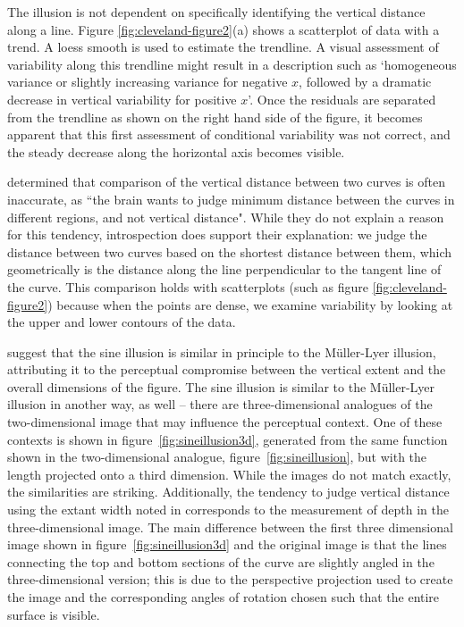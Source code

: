 \documentclass[11pt]{isuthesis}\usepackage[]{graphicx}\usepackage[]{color}
\begin{document}
The illusion is not dependent on specifically identifying the vertical distance along a line. Figure \ref{fig:cleveland-figure2}(a) shows a scatterplot of data with a trend. A loess smooth is used to estimate the trendline. A visual assessment of variability along this trendline might result in a description such as `homogeneous variance or slightly increasing variance for  negative $x$, followed by a dramatic decrease in vertical variability for positive $x$'. Once the residuals are separated from the trendline as shown on the right hand side of the figure, it becomes apparent that this first assessment of conditional variability was not correct, and the steady decrease along the horizontal axis becomes visible.

\citet{cleveland:1984} determined that comparison of the vertical distance between two curves is often inaccurate, as ``the brain wants to judge minimum distance between the curves in different regions, and not vertical distance". While they do not explain a reason for this tendency, introspection does support their explanation: we judge the distance between two curves based on the shortest distance between them, which geometrically is the distance along the line perpendicular to the tangent line of the curve. This comparison holds with scatterplots (such as figure \ref{fig:cleveland-figure2}) because when the points are dense, we examine variability by looking at the upper and lower contours of the data.

\citet{day:1991} suggest that the sine illusion is similar in principle to the M\"uller-Lyer illusion, attributing it to the perceptual compromise between the vertical extent and the overall dimensions of the figure. The sine illusion is similar to the  M\"uller-Lyer illusion in another way, as well -- there are three-dimensional analogues of the two-dimensional image that may influence the perceptual context. One of these contexts is shown in figure~\ref{fig:sineillusion3d}, generated from the same function shown in the two-dimensional analogue, figure~\ref{fig:sineillusion}, but with the length projected onto a third dimension. While the images do not match exactly, the similarities are striking. Additionally, the tendency to judge vertical distance using the extant width noted in \citep{cleveland:1985} corresponds to the measurement of depth in the three-dimensional image. The main difference between the first three dimensional image shown in figure~\ref{fig:sineillusion3d} and the original image is that the lines connecting the top and bottom sections of the curve are slightly angled in the three-dimensional version; this is due to the perspective projection used to create the image and the corresponding angles of rotation chosen such that the entire surface is visible. 
\end{document}
